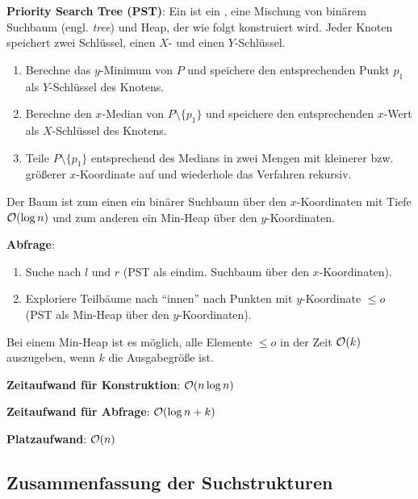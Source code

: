 \textbf{Priority Search Tree (PST)}:
Ein  ist ein , eine Mischung von
binärem Suchbaum (engl. \emph{tree}) und Heap, der wie folgt konstruiert wird.
Jeder Knoten speichert zwei Schlüssel, einen $X$- und einen $Y$-Schlüssel.
\begin{enumerate}
    \item
    Berechne das $y$-Minimum von $P$ und
    speichere den entsprechenden Punkt $p_1$ als $Y$-Schlüssel des Knotens.

    \item
    Berechne den $x$-Median von $P \setminus \{p_1\}$ und
    speichere den entsprechenden $x$-Wert als $X$-Schlüssel des Knotens.

    \item
    Teile $P \setminus \{p_1\}$ entsprechend des Medians in zwei Mengen mit kleinerer bzw.
    größerer $x$-Koordinate auf und wiederhole das Verfahren rekursiv.
\end{enumerate}

Der Baum ist zum einen ein binärer Suchbaum über den $x$-Koordinaten mit Tiefe $\mathcal{O}(\log n)$
und zum anderen ein Min-Heap über den $y$-Koordinaten.

\linie

\textbf{Abfrage}:
\begin{enumerate}
    \item
    Suche nach $l$ und $r$ (PST als eindim. Suchbaum über den $x$-Koordinaten).

    \item
    Exploriere Teilbäume nach "`innen"' nach Punkten mit $y$-Koordinate $\le o$\\
    (PST als Min-Heap über den $y$-Koordinaten).
\end{enumerate}

Bei einem Min-Heap ist es möglich, alle Elemente $\le o$ in der Zeit $\mathcal{O}(k)$ auszugeben,
wenn $k$ die Ausgabegröße ist.

\linie

\textbf{Zeitaufwand für Konstruktion}:
$\mathcal{O}(n \log n)$

\textbf{Zeitaufwand für Abfrage}:
$\mathcal{O}(\log n + k)$

\textbf{Platzaufwand}:
$\mathcal{O}(n)$

\subsection{%
    Zusammenfassung der Suchstrukturen%
}

